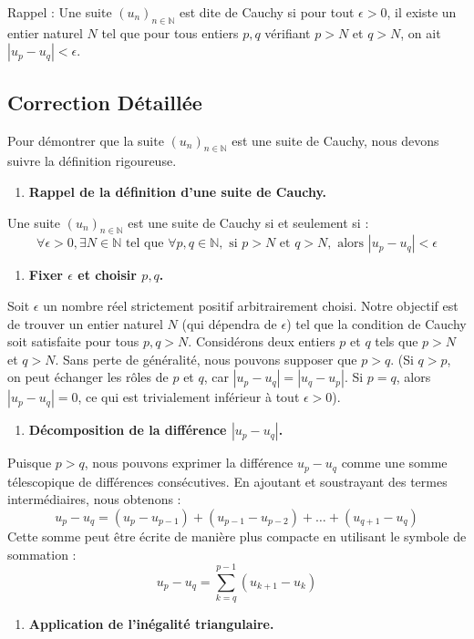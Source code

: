 \documentclass[a4paper,11pt]{report}
\begin{document}
Rappel : Une suite $(u_n)_{n \in \mathbb{N}}$ est dite de Cauchy si pour tout $\epsilon > 0$, il existe un entier naturel $N$ tel que pour tous entiers $p, q$ vérifiant $p > N$ et $q > N$, on ait $|u_p - u_q| < \epsilon$.

\subsection*{Correction Détaillée}

Pour démontrer que la suite $(u_n)_{n \in \mathbb{N}}$ est une suite de Cauchy, nous devons suivre la définition rigoureuse.
\begin{enumerate}
\item \textbf{Rappel de la définition d'une suite de Cauchy.}
\end{enumerate}
    Une suite $(u_n)_{n \in \mathbb{N}}$ est une suite de Cauchy si et seulement si :
    $$ \forall \epsilon > 0, \exists N \in \mathbb{N} \text{ tel que } \forall p, q \in \mathbb{N}, \text{ si } p > N \text{ et } q > N, \text{ alors } |u_p - u_q| < \epsilon $$
\begin{enumerate}
\item \textbf{Fixer $\epsilon$ et choisir $p, q$.}
\end{enumerate}
    Soit $\epsilon$ un nombre réel strictement positif arbitrairement choisi. Notre objectif est de trouver un entier naturel $N$ (qui dépendra de $\epsilon$) tel que la condition de Cauchy soit satisfaite pour tous $p, q > N$.
    Considérons deux entiers $p$ et $q$ tels que $p > N$ et $q > N$. Sans perte de généralité, nous pouvons supposer que $p > q$. (Si $q > p$, on peut échanger les rôles de $p$ et $q$, car $|u_p - u_q| = |u_q - u_p|$. Si $p=q$, alors $|u_p - u_q| = 0$, ce qui est trivialement inférieur à tout $\epsilon > 0$).
\begin{enumerate}
\item \textbf{Décomposition de la différence $|u_p - u_q|$.}
\end{enumerate}
    Puisque $p > q$, nous pouvons exprimer la différence $u_p - u_q$ comme une somme télescopique de différences consécutives. En ajoutant et soustrayant des termes intermédiaires, nous obtenons :
    $$ u_p - u_q = (u_p - u_{p-1}) + (u_{p-1} - u_{p-2}) + \dots + (u_{q+1} - u_q) $$
    Cette somme peut être écrite de manière plus compacte en utilisant le symbole de sommation :
    $$ u_p - u_q = \sum_{k=q}^{p-1} (u_{k+1} - u_k) $$
\begin{enumerate}
\item \textbf{Application de l'inégalité triangulaire.}
\end{enumerate}
\end{document}
